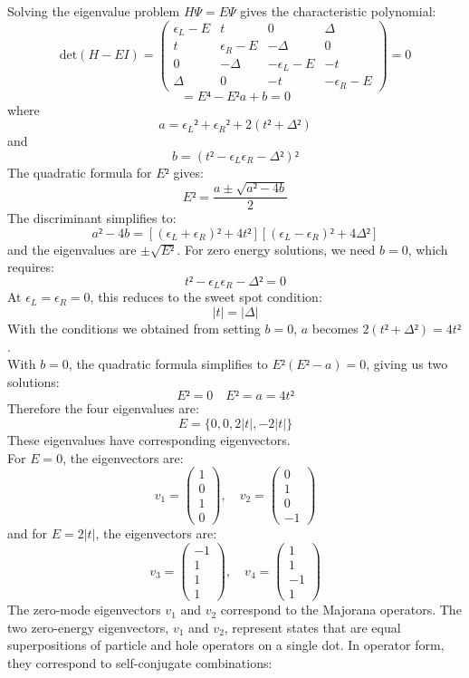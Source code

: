 \documentclass[11pt, letterpaper, titlepage]{article}
\begin{document}
Solving the eigenvalue problem $HΨ = EΨ$ gives the characteristic polynomial:
$$
\text{det}(H - EI) = \begin{pmatrix}
    ϵ_L-E & t & 0 & Δ \\
    t & ϵ_R-E & -Δ & 0 \\
    0 & -Δ & -ϵ_L-E & -t \\
    Δ & 0 & -t & -ϵ_R-E
\end{pmatrix} =0
$$
$$
= E⁴ -E²a + b=0
$$
where
$$
a = ϵ_L² + ϵ_R² + 2(t² + Δ²)
$$
and 
$$
b = (t² - ϵ_Lϵ_R - Δ²)² 
$$
The quadratic formula for $E²$ gives:
$$
E² = \frac{a ± \sqrt{a² - 4b}}{2}
$$
The discriminant simplifies to:
$$
a² - 4b = [(ϵ_L+ϵ_R)² + 4t²][(ϵ_L - ϵ_R)² + 4Δ²]
$$
and the eigenvalues are $±\sqrt{E²}$. For zero energy solutions, we need $b=0$, which requires:
$$
t² - ϵ_Lϵ_R - Δ² = 0
$$
At $ϵ_L = ϵ_R = 0$, this reduces to the sweet spot condition:
$$|t| = |Δ|$$
With the conditions we obtained from setting $b=0$, $a$ becomes $2(t² + Δ²)=4t²$.\\
With $b=0$, the quadratic formula simplifies to $E²(E²-a)=0$, giving us two solutions:
$$
E² = 0 \quad E² = a = 4t²
$$
Therefore the four eigenvalues are:
$$
E = \{0, 0, 2|t|, -2|t|\}
$$
These eigenvalues have corresponding eigenvectors. \\
For $E=0$, the eigenvectors are:
$$
v_1 =  \begin{pmatrix} 1 \\ 0 \\ 1 \\ 0 \end{pmatrix}, \quad v_2 = \begin{pmatrix} 0 \\ 1 \\ 0 \\ -1 \end{pmatrix}
$$
and for $E=2|t|$, the eigenvectors are:
$$
v_3 =  \begin{pmatrix} -1 \\ 1 \\ 1 \\ 1 \end{pmatrix}, \quad v_4 = \begin{pmatrix} 1\\ 1 \\ -1 \\ 1\end{pmatrix}
$$
The zero-mode eigenvectors $v_1$ and $v_2$ correspond to the Majorana operators. The two zero-energy eigenvectors,
$v_1$ and $v_2$, represent states that are equal superpositions of particle and hole operators on a single dot. In operator form, they correspond to self-conjugate combinations:
\end{document}

